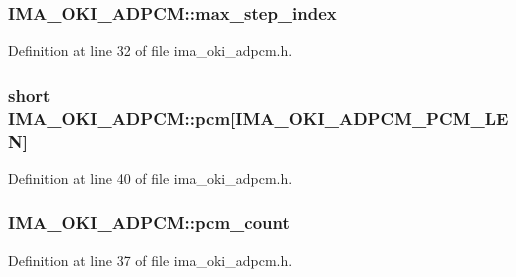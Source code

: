 \subsubsection[{\texorpdfstring{max\+\_\+step\+\_\+index}{max_step_index}}]{ I\+M\+A\+\_\+\+O\+K\+I\+\_\+\+A\+D\+P\+C\+M\+::max\+\_\+step\+\_\+index}\hypertarget{struct_i_m_a___o_k_i___a_d_p_c_m_abf3030a142bef3386328ea9a9c133d44}{}\label{struct_i_m_a___o_k_i___a_d_p_c_m_abf3030a142bef3386328ea9a9c133d44}


Definition at line 32 of file ima\+\_\+oki\+\_\+adpcm.\+h.

\subsubsection[{\texorpdfstring{pcm}{pcm}}]{\setlength{\rightskip}{0pt plus 5cm}short I\+M\+A\+\_\+\+O\+K\+I\+\_\+\+A\+D\+P\+C\+M\+::pcm\mbox{[}{\bf I\+M\+A\+\_\+\+O\+K\+I\+\_\+\+A\+D\+P\+C\+M\+\_\+\+P\+C\+M\+\_\+\+L\+EN}\mbox{]}}\hypertarget{struct_i_m_a___o_k_i___a_d_p_c_m_a48853e90c2535830172527bd91747c21}{}\label{struct_i_m_a___o_k_i___a_d_p_c_m_a48853e90c2535830172527bd91747c21}


Definition at line 40 of file ima\+\_\+oki\+\_\+adpcm.\+h.

\subsubsection[{\texorpdfstring{pcm\+\_\+count}{pcm_count}}]{ I\+M\+A\+\_\+\+O\+K\+I\+\_\+\+A\+D\+P\+C\+M\+::pcm\+\_\+count}\hypertarget{struct_i_m_a___o_k_i___a_d_p_c_m_a09920c69650ad4e266126da209377443}{}\label{struct_i_m_a___o_k_i___a_d_p_c_m_a09920c69650ad4e266126da209377443}


Definition at line 37 of file ima\+\_\+oki\+\_\+adpcm.\+h.

